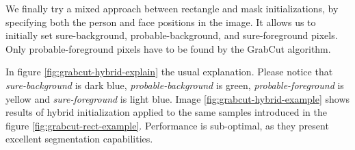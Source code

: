We finally try a mixed approach between rectangle and mask initializations, by specifying both the person and face positions in the image. It allows us to initially set sure-background, probable-background, and sure-foreground pixels. Only probable-foreground pixels have to be found by the GrabCut algorithm. 

In figure \ref{fig:grabcut-hybrid-explain} the usual explanation. Please notice that \textit{sure-background} is dark blue, \textit{probable-background} is green, \textit{probable-foreground} is yellow and \textit{sure-foreground} is light blue. 
Image \ref{fig:grabcut-hybrid-example} shows results of hybrid initialization applied to the same samples introduced in the figure \ref{fig:grabcut-rect-example}. Performance is sub-optimal, as they present excellent segmentation capabilities.

